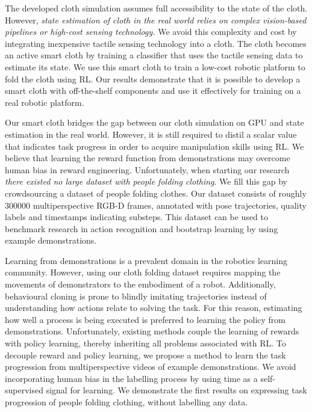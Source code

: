 \documentclass[\home/main.tex]{subfiles}
\begin{document}
The developed cloth simulation assumes full accessibility to the state of the cloth. However, \emph{state estimation of cloth in the real world relies on complex vision-based pipelines or high-cost sensing technology.} We avoid this complexity and cost by integrating inexpensive tactile sensing technology into a cloth. The cloth becomes an active smart cloth by training a classifier that uses the tactile sensing data to estimate its state. We use this smart cloth to train a low-cost robotic platform to fold the cloth using \gls{RL}. Our results demonstrate that it is possible to develop a smart cloth with off-the-shelf components and use it effectively for training on a real robotic platform. 

Our smart cloth bridges the gap between our cloth simulation on GPU and state estimation in the real world.
However, it is still required to distil a scalar value that indicates task progress in order to acquire manipulation skills using \gls{RL}. We believe that learning the reward function from demonstrations may overcome human bias in reward engineering. Unfortunately, when starting our research \emph{there existed no large dataset with people folding clothing}. We fill this gap by crowdsourcing a dataset of people folding clothes. Our dataset consists of roughly \qty{300000}{} multiperspective RGB-D frames, annotated with pose trajectories, quality labels and timestamps indicating substeps. This dataset can be used to benchmark research in action recognition and bootstrap learning by using example demonstrations. 

Learning from demonstrations is a prevalent domain in the robotics learning community. However, using our cloth folding dataset requires mapping the movements of demonstrators to the embodiment of a robot. Additionally, behavioural cloning is prone to blindly imitating trajectories instead of understanding how actions relate to solving the task. For this reason, estimating how well a process is being executed is preferred to learning the policy from demonstrations. Unfortunately, existing methods couple the learning of rewards with policy learning, thereby inheriting all problems associated with \gls{RL}.  
To decouple reward and policy learning, we propose a method to learn the task progression from multiperspective videos of example demonstrations. We avoid incorporating human bias in the labelling process by using time as a self-supervised signal for learning. We demonstrate the first results on expressing task progression of people folding clothing, without labelling any data. 
\end{document}

